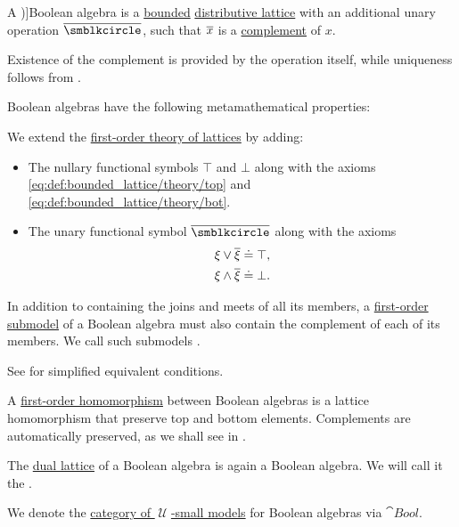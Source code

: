 \begin{definition}\label{def:boolean_algebra}
  A \term[ru=булева алгебра (\cite[def. 1.1]{Гуров2013ТеорияРешёток})]{Boolean algebra} is a \hyperref[def:extremal_points/bounds]{bounded} \hyperref[def:distributive_lattice]{distributive lattice} with an additional unary operation \( {\oline \anon} \), such that \( {\oline x} \) is a \hyperref[def:bounded_lattice_complement]{complement} of \( x \).

  Existence of the complement is provided by the operation itself, while uniqueness follows from .

  Boolean algebras have the following metamathematical properties:
  \begin{thmenum}
    \mimprovised We extend the \hyperref[def:lattice/theory]{first-order theory of lattices} by adding:
    \begin{itemize}
      \item The nullary functional symbols \( \top \) and \( \bot \) along with the axioms \eqref{eq:def:bounded_lattice/theory/top} and \eqref{eq:def:bounded_lattice/theory/bot}.

      \item The unary functional symbol \( {\oline {\anon}} \) along with the axioms
      \begin{align}
        \xi \vee \oline \xi \syneq \top, \label{eq:def:boolean_algebra/join} \\
        \xi \wedge \oline \xi \syneq \bot. \label{eq:def:boolean_algebra/meet}
      \end{align}
    \end{itemize}

     In addition to containing the joins and meets of all its members, a \hyperref[def:first_order_submodel]{first-order submodel} of a Boolean algebra must also contain the complement of each of its members. We call such submodels .

    See  for simplified equivalent conditions.

     A \hyperref[def:first_order_homomorphism]{first-order homomorphism} between Boolean algebras is a lattice homomorphism that preserve top and bottom elements. Complements are automatically preserved, as we shall see in .

     The \hyperref[def:lattice/opposite]{dual lattice} of a Boolean algebra is again a Boolean algebra. We will call it the .

     We denote the \hyperref[def:category_of_small_first_order_models]{category of \( \mscrU \)-small models} for Boolean algebras via \( \cat{Bool} \).
  \end{thmenum}
\end{definition}

